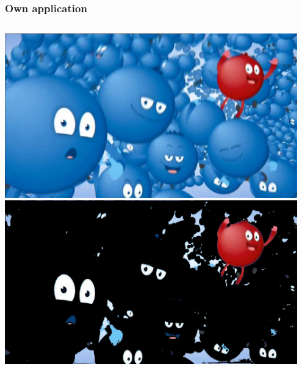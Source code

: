\documentclass{beamer}
\begin{document}
\begin{frame}
    \frametitle{Own application}
    \begin{columns}
            \centering
            \includegraphics[width=0.95\textwidth]{report-images/a_comm_0225.jpg}
            \centering
            \includegraphics[width=0.95\textwidth]{report-images/thresh_a_comm_0225.jpg}
    \end{columns}
\end{frame}
\end{document}
